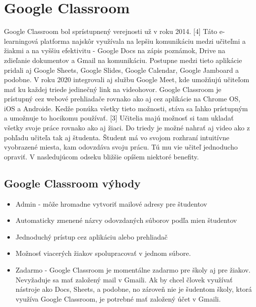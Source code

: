 \documentclass[10pt,twoside,slovak,a4paper]{article}
\begin{document}
\section{Google Classroom} \label{Google Classroom}

Google Classroom bol sprístupnený verejnosti už v roku 2014. [4] Táto e-learningová platforma najskôr využívala na lepšiu komunikáciu medzi učiteľmi a žiakmi a na vyššiu efektivitu - Google Docs na zápis poznámok, Drive na zdieľanie dokumentov a Gmail na komunikáciu. Postupne medzi tieto aplikácie pridali aj Google Sheets, Google Slides, Google Calendar, Google Jamboard a podobne. V roku 2020 integrovali aj službu Google Meet, kde umožňujú učiteľom mať ku každej triede jedinečný link na videohovor. Google Classroom je prístupný cez webové prehliadače rovnako ako aj cez aplikácie na Chrome OS, iOS a Androide. Kedže ponúka všetky tieto možnosti, stáva sa ľahko prístupným a umožnuje to hocikomu používať. [3] Učitelia majú možnosť si tam ukladať všetky svoje práce rovnako ako aj žiaci. Do triedy je možné nahrať aj video ako z pohľadu učiteľa tak aj študenta. Študent má vo svojom rozhraní intuitívne vyobrazené miesta, kam odovzdáva svoju prácu. Tú mu vie učiteľ jednoducho opraviť. V nasledujúcom odseku bližšie opíšem niektoré benefity.

\subsection{Google Classroom výhody} \label{Google Classroom: Google Classroom výhody}

\begin{itemize}
	\item Admin - môže hromadne vytvoriť mailové adresy pre študentov
	\item Automaticky zmenené názvy odovzdaných súborov podľa mien študentov
	\item Jednoduchý prístup cez aplikáciu alebo prehliadač
	\item Možnosť viacerých žiakov spolupracovať v jednom súbore.
	\item Zadarmo -
Google Classroom je momentálne zadarmo pre školy aj pre žiakov. Nevyžaduje sa mať založený mail v Gmaili. Ak by chcel človek využívať nástroje ako Docs, Sheets, a podobne, no zároveň nie je šudentom školy, ktorá využíva Google Classroom, je potrebné mať založený účet v Gmaili. 
	\end{itemize}
\end{document}
